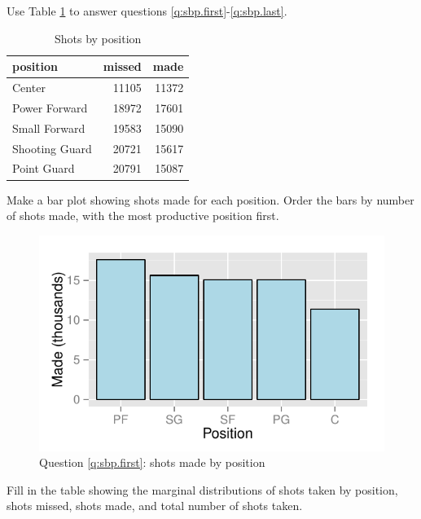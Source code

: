 \documentclass[letterpaper, landscape]{exam}
\begin{document}
\begin{questions}
{        Use Table \ref{tab:sbp} to answer questions \ref{q:sbp.first}-\ref{q:sbp.last}.

        \begin{table}[H]
          \centering
          \begin{tabular}{lrr}
            \toprule
            position       & missed & made \\
            \midrule
            Center         & 11105  & 11372 \\
            Power Forward  & 18972  & 17601 \\
            Small Forward  & 19583  & 15090 \\
            Shooting Guard & 20721  & 15617 \\
            Point Guard    & 20791  & 15087 \\
            \bottomrule
          \end{tabular}
          \caption{Shots by position}
          \label{tab:sbp}
        \end{table}
      }

      \question[5] Make a bar plot showing shots made for each position.  Order
        the bars by number of shots made, with the most productive position first.
        \label{q:sbp.first}

        \begin{solution}
          \begin{figure}[H]
            \centering
            \includegraphics[scale = 0.8]{figures/shots_made.pdf}
            \caption{Question \ref{q:sbp.first}: shots made by position}
            \label{fig:sbp}
          \end{figure}

        \end{solution}
      \question[5] Fill in the table showing the marginal distributions of shots
      taken by position, shots missed, shots made, and total number of shots
      taken.


\end{questions}
\end{document}
